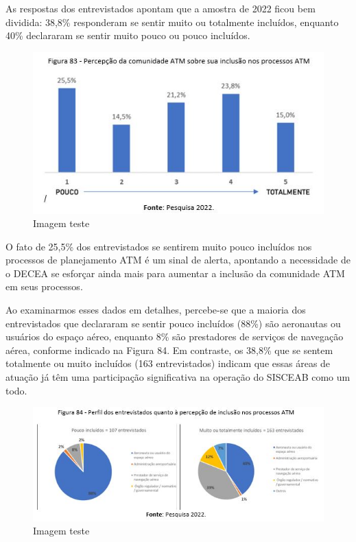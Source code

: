 \documentclass[
]{book}
\begin{document}
As respostas dos entrevistados apontam que a amostra de 2022 ficou bem dividida: 38,8\% responderam se sentir muito ou totalmente incluídos, enquanto 40\% declararam se sentir muito pouco ou pouco incluídos.

\begin{figure}
\centering
\includegraphics{imagens/fig70.jpg}
\caption{Imagem teste}
\end{figure}

O fato de 25,5\% dos entrevistados se sentirem muito pouco incluídos nos processos de planejamento ATM é um sinal de alerta, apontando a necessidade de o DECEA se esforçar ainda mais para aumentar a inclusão da comunidade ATM em seus processos.

Ao examinarmos esses dados em detalhes, percebe-se que a maioria dos entrevistados que declararam se sentir pouco incluídos (88\%) são aeronautas ou usuários do espaço aéreo, enquanto 8\% são prestadores de serviços de navegação aérea, conforme indicado na Figura 84. Em contraste, os 38,8\% que se sentem totalmente ou muito incluídos (163 entrevistados) indicam que essas áreas de atuação já têm uma participação significativa na operação do SISCEAB como um todo.

\begin{figure}
\centering
\includegraphics{imagens/fig71.jpg}
\caption{Imagem teste}
\end{figure}
\end{document}
